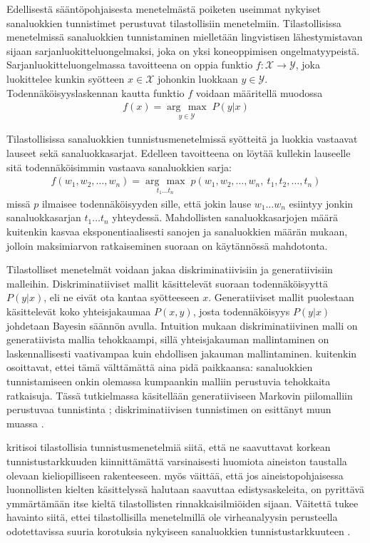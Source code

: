 \documentclass[utf8,bachelor,manualbib]{gradu3}
\newcommand{\argmax}[1]{\underset{#1}{\operatorname{arg}\,\operatorname{max}}\;}
\begin{document}
Edellisestä sääntöpohjaisesta menetelmästä poiketen useimmat nykyiset sanaluokkien tunnistimet perustuvat tilastollisiin menetelmiin. Tilastollisissa menetelmissä sanaluokkien tunnistaminen mielletään lingvistisen lähestymistavan sijaan sarjanluokitteluongelmaksi, joka on yksi koneoppimisen ongelmatyypeistä. Sarjanluokitteluongelmassa tavoitteena on oppia funktio $f: \mathcal{X} \to \mathcal{Y}$, joka luokittelee kunkin syötteen $x \in \mathcal{X}$ johonkin luokkaan $y \in \mathcal{Y}$. Todennäköisyyslaskennan kautta funktio $f$ voidaan määritellä muodossa
\begin{align}
f(x) = \argmax{y \in \mathcal{Y}} P(y|x)
\end{align}

Tilastollisissa sanaluokkien tunnistusmenetelmissä syötteitä ja luokkia vastaavat lauseet sekä sanaluokkasarjat. Edelleen tavoitteena on löytää kullekin lauseelle sitä todennäköisimmin vastaava sanaluokkien sarja:
\begin{align}
f(w_1, w_2, \ldots, w_n) = \argmax{t_1 \ldots t_n} p(w_1, w_2, \ldots, w_n,\: t_1, t_2, \ldots, t_n)
\label{statisticalproblem}
\end{align}
missä $p$ ilmaisee todennäköisyyden sille, että jokin lause $ w_1 \ldots w_n $ esiintyy jonkin sanaluokkasarjan $ t_1 \ldots t_n $ yhteydessä. Mahdollisten sanaluokkasarjojen määrä kuitenkin kasvaa eksponentiaalisesti sanojen ja sanaluokkien määrän mukaan, jolloin maksimiarvon ratkaiseminen suoraan on käytännössä mahdotonta.

Tilastolliset menetelmät voidaan jakaa diskriminatiivisiin ja generatiivisiin malleihin. Diskriminatiiviset mallit käsittelevät suoraan todennäköisyyttä $P(y|x)$, eli ne eivät ota kantaa syötteeseen $x$. Generatiiviset mallit puolestaan käsittelevät koko yhteisjakaumaa $P(x,y)$, josta todennäköisyys $P(y|x)$ johdetaan Bayesin säännön avulla. Intuition mukaan diskriminatiivinen malli on generatiivista mallia tehokkaampi, sillä yhteisjakauman mallintaminen on laskennallisesti vaativampaa kuin ehdollisen jakauman mallintaminen.  kuitenkin osoittavat, ettei tämä välttämättä aina pidä paikkaansa: sanaluokkien tunnistamiseen onkin olemassa kumpaankin malliin perustuvia tehokkaita ratkaisuja. Tässä tutkielmassa käsitellään generatiiviseen Markovin piilomalliin perustuvaa tunnistinta \citep{brants2000}; diskriminatiivisen tunnistimen on esittänyt muun muassa \citet{ratnaparkhi1996}.

\citet{brill1992} kritisoi tilastollisia tunnistusmenetelmiä siitä, että ne saavuttavat korkean tunnistustarkkuuden kiinnittämättä varsinaisesti huomiota aineiston taustalla olevaan kieliopilliseen rakenteeseen. \citet{brill1995} myös väittää, että jos aineistopohjaisessa luonnollisten kielten käsittelyssä halutaan saavuttaa edistysaskeleita, on pyrittävä ymmärtämään itse kieltä tilastollisten rinnakkaisilmiöiden sijaan. Väitettä tukee havainto siitä, ettei tilastollisilla menetelmillä ole virheanalyysin perusteella odotettavissa suuria korotuksia nykyiseen sanaluokkien tunnistustarkkuuteen \citep{manning2011}.
\end{document}

